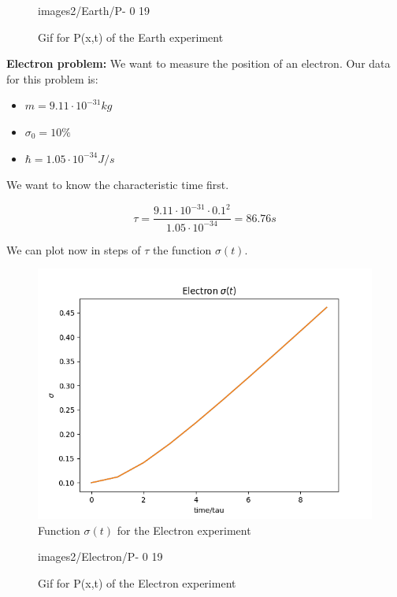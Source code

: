 \begin{figure}[H]
    \centering
    {images2/Earth/P-}%
    {0}%
    {19}%
    \caption{Gif for P(x,t) of the Earth experiment}
    \label{P_earth}
\end{figure}

\textbf{Electron problem: } We want to measure the position of an electron. Our data for this problem is:

\begin{itemize}
    \item $m = 9.11 \cdot 10^{-31} kg$
    \item $ \sigma_0 = 10\% $
    \item $\hbar = 1.05 \cdot 10^{-34} J/s$
\end{itemize}

We want to know the characteristic time first.

\begin{equation}
    \label{2.39}
    \tau = \frac{9.11\cdot 10^{-31}\cdot 0.1^2}{1.05 \cdot 10^{-34}} = 86.76 s
\end{equation}

We can plot now in steps of $\tau$ the function $\sigma(t)$.

\begin{figure}[H]
    \centering
    \includegraphics{images2/Electron/sigma.png}
    \caption{Function $\sigma(t)$ for the Electron experiment}
    \label{fig:sigma_electron}
\end{figure}

\begin{figure}[H]
    \centering
    {images2/Electron/P-}%
    {0}%
    {19}%
    \caption{Gif for P(x,t) of the Electron experiment}
    \label{P_electron}
\end{figure}

